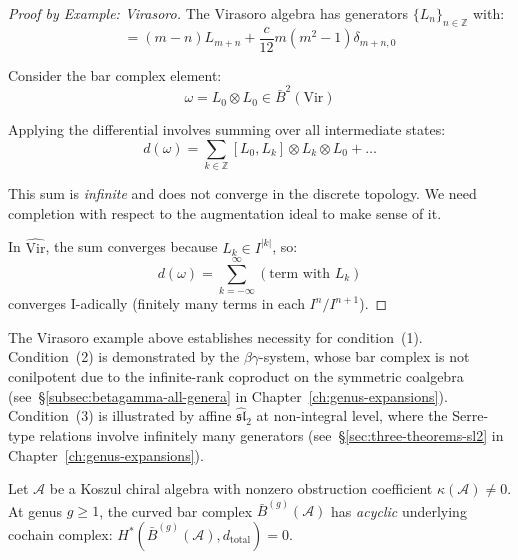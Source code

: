 \begin{proof}[Proof by Example: Virasoro]
The Virasoro algebra has generators $\{L_n\}_{n \in \mathbb{Z}}$ with:
\begin{equation}
[L_m, L_n] = (m-n)L_{m+n} + \frac{c}{12}m(m^2-1)\delta_{m+n,0}
\end{equation}

Consider the bar complex element:
\begin{equation}
\omega = L_0 \otimes L_0 \in \bar{B}^2(\text{Vir})
\end{equation}

Applying the differential involves summing over all intermediate states:
\begin{equation}
d(\omega) = \sum_{k \in \mathbb{Z}} [L_0, L_k] \otimes L_k \otimes L_0 + \ldots
\end{equation}

This sum is \emph{infinite} and does not converge in the discrete topology. We need 
completion with respect to the augmentation ideal to make sense of it.

In $\hat{\text{Vir}}$, the sum converges because $L_k \in I^{|k|}$, so:
\begin{equation}
d(\omega) = \sum_{k=-\infty}^\infty (\text{term with } L_k) 
\end{equation}
converges I-adically (finitely many terms in each $I^n/I^{n+1}$).
\end{proof}

\begin{remark}\label{rem:completion-necessity-scope}
The Virasoro example above establishes necessity for condition~(1).
Condition~(2) is demonstrated by the $\beta\gamma$-system, whose bar complex is not conilpotent due to the infinite-rank coproduct on the symmetric coalgebra (see~\S\ref{subsec:betagamma-all-genera} in Chapter~\ref{ch:genus-expansions}).
Condition~(3) is illustrated by affine $\widehat{\mathfrak{sl}}_2$ at non-integral level, where the Serre-type relations involve infinitely many generators (see~\S\ref{sec:three-theorems-sl2} in Chapter~\ref{ch:genus-expansions}).
\end{remark}

\begin{proposition}
\label{prop:curved-bar-acyclicity}
Let $\mathcal{A}$ be a Koszul chiral algebra with nonzero obstruction
coefficient $\kappa(\mathcal{A}) \neq 0$.  At genus $g \geq 1$,
the curved bar complex $\bar{B}^{(g)}(\mathcal{A})$ has \emph{acyclic}
underlying cochain complex: $H^*(\bar{B}^{(g)}(\mathcal{A}), d_{\mathrm{total}}) = 0$.
\end{proposition}

